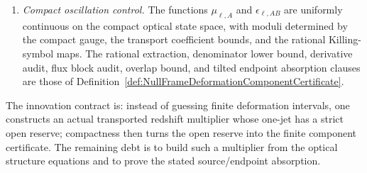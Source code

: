 \begin{definition}
\begin{enumerate}
    \item \emph{Compact oscillation control.}  The functions
    $\mu_{\ell,A}$ and $\epsilon_{\ell,AB}$ are uniformly continuous on the
    compact optical state space, with moduli determined by the compact gauge,
    the transport coefficient bounds, and the rational Killing-symbol maps.
    The rational extraction, denominator lower bound, derivative audit, flux
    block audit, overlap bound, and tilted endpoint absorption clauses are those
    of Definition~\ref{def:NullFrameDeformationComponentCertificate}.
\end{enumerate}
The innovation contract is: instead of guessing finite deformation intervals,
one constructs an actual transported redshift multiplier whose one-jet has a
strict open reserve; compactness then turns the open reserve into the finite
component certificate.  The remaining debt is to build such a multiplier from
the optical structure equations and to prove the stated source/endpoint
absorption.
\end{definition}

